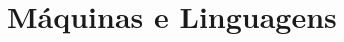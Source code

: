 \documentclass[b5paper,10pt]{book}
\begin{document}
	\part{Máquinas e Linguagens}
	
	
	

\end{document}
